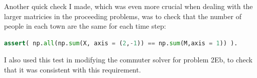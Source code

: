 Another quick check I made, which was even more crucial when dealing with the larger matricies in the proceeding problems, was to check that the number of people in each town are the same for each time step: 
\begin{lstlisting}[language=Python]
assert( np.all(np.sum(X, axis = (2,-1)) == np.sum(M,axis = 1)) ).
\end{lstlisting}
I also used this test in modifying the commuter solver for problem 2Eb, to check that it was consistent with this requirement.

\clearpage